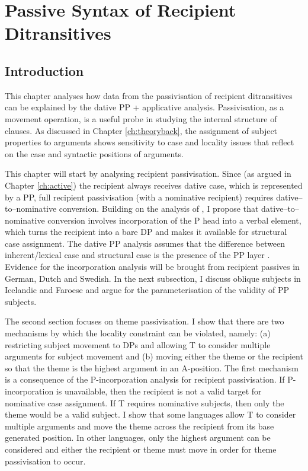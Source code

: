 \chapter{Passive Syntax of Recipient Ditransitives}\label{ch:passive}
\section{Introduction}
This chapter analyses how data from the passivisation of recipient ditransitives can be explained by the dative PP + applicative analysis. Passivisation, as a movement operation, is a useful probe in studying the internal structure of clauses. As discussed in Chapter \ref{ch:theoryback}, the assignment of subject properties to arguments shows sensitivity to case and locality issues that reflect on the case and syntactic positions of arguments.

This chapter will start by analysing recipient passivisation. Since (as argued in Chapter \ref{ch:active}) the recipient always receives dative case, which is represented by a PP, full recipient passivisation (with a nominative recipient) requires dative--to--nominative conversion. Building on the analysis of \cite{Alexiadou.2014}, I propose that dative--to--nominative conversion involves incorporation of the P head into a verbal element, which turns the recipient into a bare DP and makes it available for structural case assignment. The dative PP analysis assumes that the difference between inherent/lexical case and structural case is the presence of the PP layer \citep{Bayer.2001}. Evidence for the incorporation analysis will be brought from recipient passives in German, Dutch and Swedish. In the next subsection, I discuss oblique subjects in Icelandic and Faroese and argue for the parameterisation of the validity of PP subjects.

The second section focuses on theme passivisation. I show that there are two mechanisms by which the locality constraint can be violated, namely: (a) restricting subject movement to DPs and allowing T to consider multiple arguments for subject movement and (b) moving either the theme or the recipient so that the theme is the highest argument in an A-position. The first mechanism is a consequence of the P-incorporation analysis for recipient passivisation. If P-incorporation is unavailable, then the recipient is not a valid target for nominative case assignment. If T requires nominative subjects, then only the theme would be a valid subject. I show that some languages allow T to consider multiple arguments and move the theme across the recipient from its base generated position. In other languages, only the highest argument can be considered and either the recipient or theme must move in order for theme passivisation to occur.

